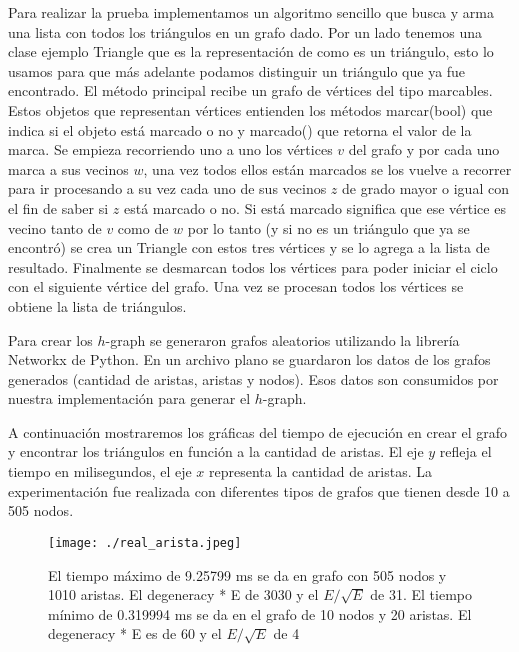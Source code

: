 \documentclass[%
    a4paper,%
    fontsize=12pt,%
    DIV=12,
    twoside,%
    openright,%
    titlepage=true,%
    headsepline,%
    toc=bibliography,%
    parskip=half,%
    cleardoublepage=empty,%
    headings=big,%
]{scrbook}
\begin{document}
Para realizar la prueba implementamos un algoritmo sencillo que busca y arma una lista
con todos los triángulos en un grafo dado. Por un lado tenemos una clase ejemplo Triangle
que es la representación de como es un triángulo, esto lo usamos para que más adelante
podamos distinguir un triángulo que ya fue encontrado. El método principal recibe un
grafo de vértices del tipo marcables. Estos objetos que representan vértices entienden los métodos marcar(bool) que indica si el objeto está marcado o no y marcado() que retorna el valor de la marca. Se empieza recorriendo uno a uno los vértices $v$ del grafo y por cada uno marca a sus vecinos $w$, una vez todos ellos están marcados se los vuelve a recorrer para ir procesando a su vez cada uno de sus vecinos $z$ de grado mayor o igual con el fin de saber si $z$ está marcado o no. Si está marcado significa que ese vértice es vecino tanto de $v$ como de $w$ por lo tanto (y si no es un triángulo que ya se encontró) se crea un Triangle con estos tres vértices y se lo agrega a la lista de resultado. Finalmente se desmarcan todos los vértices para poder iniciar el ciclo con el siguiente vértice del grafo.
Una vez se procesan todos los vértices se obtiene la lista de triángulos.

Para crear los $h$-graph se generaron grafos aleatorios utilizando la librería Networkx de Python. En un archivo plano se guardaron los datos de los grafos generados (cantidad de aristas, aristas y nodos). Esos datos son consumidos por nuestra implementación para generar el $h$-graph.

A continuación mostraremos los gráficas del tiempo de ejecución en crear el grafo y
encontrar los triángulos en función a la cantidad de aristas. El eje $y$ refleja el
tiempo en milisegundos, el eje $x$ representa la cantidad de aristas.
La experimentación fue realizada con diferentes tipos de grafos que tienen desde 10 a 505 nodos.

\begin{figure}
  \centering
   \texttt{[image: ./real\_arista.jpeg]}

  \caption{El tiempo máximo de 9.25799 ms se da en grafo con 505 nodos y 1010 aristas. El degeneracy * E de 3030 y el $E/\sqrt{E}$ de 31. El tiempo mínimo de 0.319994 ms se da en el grafo de 10 nodos y 20 aristas. El degeneracy * E es de 60 y el $E/\sqrt{E}$ de 4 }\label{fig:realWorld}
\end{figure}
\end{document}
